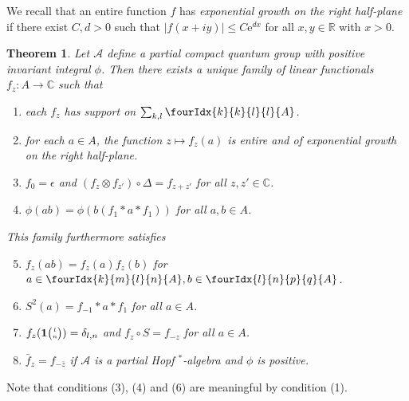 \documentclass[10pt]{article}
\newcommand{\C}{\mathbb{C}}
\newcommand{\R}{\mathbb{R}}
\newcommand{\Grt}[3]{#1{\tiny {\begin{pmatrix} #2\\#3\end{pmatrix}}}}
\newcommand{\UnitC}[2]{\Grt{\mathbf{1}}{#1}{#2}}
\newcommand{\Gr}[5]{\fourIdx{#2}{#4}{#3}{#5}{#1}}%
\newtheorem{Theorem}{Theorem}[section]
\theoremstyle{definition}
\numberwithin{equation}{section}
\begin{document}
We recall that an entire function $f$ has \emph{exponential growth
  on the right half-plane} if there exist $C,d>0$ such that $|f(x+iy)|\leq
C\mathrm{e}^{dx}$  for all $x,y\in \R$ with $x>0$. 

\begin{Theorem} \label{thm:rep-characters} Let $\mathscr{A}$ define a
  partial compact quantum group with positive invariant integral $\phi$.  Then there
  exists a unique family of linear functionals $f_{z} \colon A\to \C$
  such that
\begin{enumerate}[label={(\arabic*)}]
  \item each $f_z$ has support on $\sum_{k,l}\Gr{A}{k}{l}{k}{l}$.
  \item for each $a\in A$, the function $z\mapsto f_{z}(a)$ is entire
    and of exponential growth on the right half-plane.
  \item $f_{0} = \epsilon$ and $(f_{z} \otimes f_{z'}) \circ 
    \Delta= f_{z+z'}$ for all $z,z' \in \C$.
  \item $\phi(ab)=\phi(b(f_{1} \ast a \ast f_{1}))$ for all $a,b\in A$.
  \end{enumerate}
  This family furthermore satisfies
  \begin{enumerate}[label={(\arabic*)}]\setcounter{enumi}{4}
  \item $f_z(ab) = f_z(a)f_z(b)$ for $a\in \Gr{A}{k}{l}{m}{n},b\in \Gr{A}{l}{p}{n}{q}$. 
  \item $S^{2}(a)=f_{-1} \ast a \ast f_{1}$ for all $a\in A$.
  \item $f_{z}(\UnitC{l}{n})=\delta_{l,n}$ and $f_{z} \circ S = f_{-z}$ for all $a\in A$.
  \item $\bar{f}_{z}=f_{-\overline{z}}$ if $\mathscr{A}$ is a partial
    Hopf $^*$-algebra and $\phi$ is positive.
\end{enumerate}
\end{Theorem}


Note that conditions (3), (4) and (6) are meaningful by condition (1).
\end{document}
